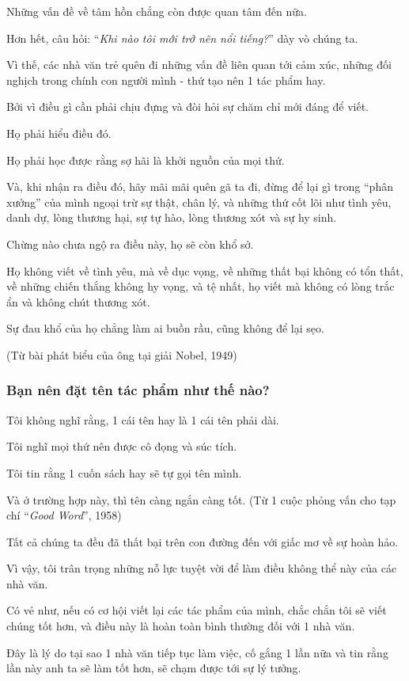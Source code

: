 \documentclass{article}
\begin{document}
Những vấn đề về tâm hồn chẳng còn được quan tâm đến nữa.

Hơn hết, câu hỏi: ``\textit{Khi nào tôi mới trở nên nổi tiếng?}'' dày vò chúng ta.

Vì thế, các nhà văn trẻ quên đi những vấn đề liên quan tới cảm xúc, những đối nghịch trong chính con người mình - thứ tạo nên 1 tác phẩm hay.

Bởi vì điều gì cần phải chịu đựng và đòi hỏi sự chăm chỉ mới đáng để viết.

%
Họ phải hiểu điều đó.

Họ phải học được rằng sợ hãi là khởi nguồn của mọi thứ.

Và, khi nhận ra điều đó, hãy mãi mãi quên gã ta đi, đừng để lại gì trong ``phân xưởng'' của mình ngoại trừ sự thật, chân lý, và những thứ cốt lõi như tình yêu, danh dự, lòng thương hại, sự tự hào, lòng thương xót và sự hy sinh.

Chừng nào chưa ngộ ra điều này, họ sẽ còn khổ sở.

Họ không viết về tình yêu, mà về dục vọng, về những thất bại không có tổn thất, về những chiến thắng không hy vọng, và tệ nhất, họ viết mà không có lòng trắc ẩn và không chút thương xót.

Sự đau khổ của họ chẳng làm ai buồn rầu, cũng không để lại sẹo.

(Từ bài phát biểu của ông tại giải Nobel, 1949)

\subsubsection{Bạn nên đặt tên tác phẩm như thế nào?}
Tôi không nghĩ rằng, 1 cái tên hay là 1 cái tên phải dài.

Tôi nghĩ mọi thứ nên được cô đọng và súc tích.

Tôi tin rằng 1 cuốn sách hay sẽ tự gọi tên mình.

Và ở trường hợp này, thì tên càng ngắn càng tốt. (Từ 1 cuộc phỏng vấn cho tạp chí ``\textit{Good Word}'', 1958)

%
Tất cả chúng ta đều đã thất bại trên con đường đến với giấc mơ về sự hoàn hảo.

Vì vậy, tôi trân trọng những nỗ lực tuyệt vời để làm điều không thể này của các nhà văn.

Có vẻ như, nếu có cơ hội viết lại các tác phẩm của mình, chắc chắn tôi sẽ viết chúng tốt hơn, và điều này là hoàn toàn bình thường đối với 1 nhà văn.

Đây là lý do tại sao 1 nhà văn tiếp tục làm việc, cố gắng 1 lần nữa và tin rằng lần này anh ta sẽ làm tốt hơn, sẽ chạm được tới sự lý tưởng.
\end{document}
